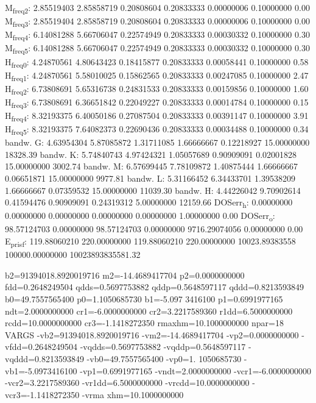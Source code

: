 \documentclass[11pt]{article}
\begin{document}
M\textsubscript{freq}\textsubscript{2}:   2.85519403   2.85858719   0.20808604   0.20833333   0.00000006   0.10000000         0.00
M\textsubscript{freq}\textsubscript{3}:   2.85519404   2.85858719   0.20808604   0.20833333   0.00000006   0.10000000         0.00
M\textsubscript{freq}\textsubscript{4}:   6.14081288   5.66706047   0.22574949   0.20833333   0.00030332   0.10000000         0.30
M\textsubscript{freq}\textsubscript{5}:   6.14081288   5.66706047   0.22574949   0.20833333   0.00030332   0.10000000         0.30
H\textsubscript{freq}\textsubscript{0}:   4.24870561   4.80643423   0.18415877   0.20833333   0.00058441   0.10000000         0.58
H\textsubscript{freq}\textsubscript{1}:   4.24870561   5.58010025   0.15862565   0.20833333   0.00247085   0.10000000         2.47
H\textsubscript{freq}\textsubscript{2}:   6.73808691   5.65316738   0.24831533   0.20833333   0.00159856   0.10000000         1.60
H\textsubscript{freq}\textsubscript{3}:   6.73808691   6.36651842   0.22049227   0.20833333   0.00014784   0.10000000         0.15
H\textsubscript{freq}\textsubscript{4}:   8.32193375   6.40050186   0.27087504   0.20833333   0.00391147   0.10000000         3.91
H\textsubscript{freq}\textsubscript{5}:   8.32193375   7.64082373   0.22690436   0.20833333   0.00034488   0.10000000         0.34
bandw. G:   4.63954304   5.87085872   1.31711085   1.66666667   0.12218927  15.00000000     18328.39
bandw. K:   5.74840743   4.97424321   1.05057689   0.90909091   0.02001828  15.00000000      3002.74
bandw. M:   6.57699445   7.78109872   1.40875444   1.66666667   0.06651871  15.00000000      9977.81
bandw. L:   5.31166452   6.34433701   1.39538209   1.66666667   0.07359532  15.00000000     11039.30
bandw. H:   4.44226042   9.70902614   0.41594476   0.90909091   0.24319312   5.00000000     12159.66
DOSerr\textsubscript{h}:   0.00000000   0.00000000   0.00000000   0.00000000   0.00000000   1.00000000         0.00
DOSerr\textsubscript{o}:  98.57124703   0.00000000  98.57124703   0.00000000 9716.29074056   0.00000000         0.00
E\textsubscript{pris}\textsubscript{f}: 119.88060210 220.00000000 119.88060210 220.00000000 10023.89383558 100000.00000000 10023893835581.32



  b2=91394018.8920019716 m2=-14.4689417704 p2=0.0000000000 fdd=0.2648249504 qdds=0.5697753882 qddp=0.5648597117 qddd=0.8213593849 b0=49.7557565400 p0=1.1050685730 b1=-5.097
3416100 p1=0.6991977165 ndt=2.0000000000 cr1=-6.0000000000 cr2=3.2217589360 r1dd=6.5000000000 rcdd=10.0000000000 cr3=-1.1418272350 rmaxhm=10.1000000000 npar=18 
VARGS
    -vb2=91394018.8920019716 -vm2=-14.4689417704 -vp2=0.0000000000 -vfdd=0.2648249504 -vqdds=0.5697753882 -vqddp=0.5648597117 -vqddd=0.8213593849 -vb0=49.7557565400 -vp0=1.
1050685730 -vb1=-5.0973416100 -vp1=0.6991977165 -vndt=2.0000000000 -vcr1=-6.0000000000 -vcr2=3.2217589360 -vr1dd=6.5000000000 -vrcdd=10.0000000000 -vcr3=-1.1418272350 -vrma
xhm=10.1000000000 
\end{document}
